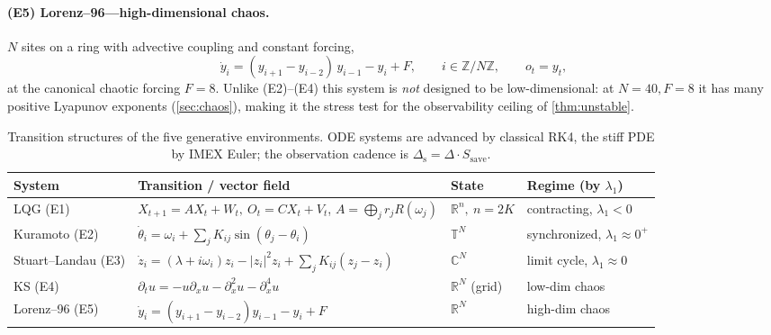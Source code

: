 \documentclass[10pt]{article}
\theoremstyle{plain}
\theoremstyle{definition}
\theoremstyle{remark}
\newcommand{\R}{\mathbb{R}}
\newcommand{\abs}[1]{\left\lvert #1 \right\rvert}
\begin{document}
\paragraph{(E5) Lorenz--96---high-dimensional chaos.}
$N$ sites on a ring with advective coupling and constant forcing,
\begin{equation}
 \dot y_i=(y_{i+1}-y_{i-2})\,y_{i-1}-y_i+F,\qquad i\in\mathbb Z/N\mathbb Z,\qquad
 o_t=y_t,
 \label{eq:lor96}
\end{equation}
at the canonical chaotic forcing $F=8$. Unlike (E2)--(E4) this system is
\emph{not} designed to be low-dimensional: at $N=40,F=8$ it has many positive
Lyapunov exponents (\cref{sec:chaos}), making it the stress test for the
observability ceiling of \cref{thm:unstable}.

\begin{table}[t]
\centering\small
\setlength{\tabcolsep}{5pt}\renewcommand{\arraystretch}{1.35}
\caption{Transition structures of the five generative environments. ODE systems
are advanced by classical RK4, the stiff PDE by IMEX Euler; the observation
cadence is $\Delta_{\mathrm s}=\Delta\cdot S_{\mathrm{save}}$.}
\label{tab:zoo}
\begin{tabular}{@{}p{2.15cm}p{5.4cm}p{2.0cm}p{3.1cm}@{}}
\toprule
System & Transition / vector field & State & Regime (by $\lambda_1$)\\
\midrule
LQG (E1) & $X_{t+1}=AX_t+W_t,\ O_t=CX_t+V_t$, \newline $A=\bigoplus_j r_jR(\omega_j)$ & $\R^{n},\ n=2K$ & contracting, $\lambda_1<0$\\
Kuramoto (E2) & $\dot\theta_i=\omega_i+\sum_j K_{ij}\sin(\theta_j-\theta_i)$ & $\mathbb T^{N}$ & synchronized, $\lambda_1\!\approx\!0^{+}$\\
Stuart--Landau (E3) & $\dot z_i=(\lambda+i\omega_i)z_i-\abs{z_i}^2z_i+\sum_j K_{ij}(z_j-z_i)$ & $\mathbb C^{N}$ & limit cycle, $\lambda_1\!\approx\!0$\\
KS (E4) & $\partial_t u=-u\partial_x u-\partial_x^2u-\partial_x^4u$ & $\R^{N}$ (grid) & low-dim chaos\\
Lorenz--96 (E5) & $\dot y_i=(y_{i+1}-y_{i-2})y_{i-1}-y_i+F$ & $\R^{N}$ & high-dim chaos\\
\bottomrule
\end{tabular}
\end{table}
\end{document}
